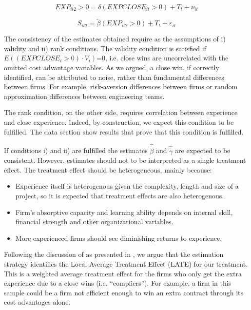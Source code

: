 \begin{equation}
\label{eqn:firststage}
EXP_{it2}>0= \delta (EXPCLOSE_{it}>0)+T_t+\nu_{it}
\end{equation}

\begin{equation}
\label{eqn:secondstage}
S_{it2}= \tilde{\beta} (EXP_{it2}>0)+T_t+\varepsilon_{it}
\end{equation}

The consistency of the estimates obtained require as the assumptions of i) validity and ii) rank conditions. The validity condition is satisfied if $E((EXPCLOSE_{i}>0)\cdot V_i)$=0, i.e. close wins are uncorrelated with the omitted cost advantage variables. As we argued, a close win, if correctly identified, can be attributed to noise, rather than fundamental differences between firms. For example, risk-aversion differences between firms or random approximation differences between engineering teams.

The rank condition, on the other side, requires correlation between experience and close experience. Indeed, by construction, we expect this condition to be fulfilled.  The data section show results that prove that this condition is fulfilled.

If conditions i) and ii) are fulfilled the estimates $\hat{\tilde{\beta}}$ and $\hat{\tilde{\gamma}}$ are expected to be consistent. However, estimates should not to be interpreted as a single treatment effect. The treatment effect should be heterogeneous, mainly because:
\vspace{-5pt}
\begin{itemize}[itemsep=1pt]
  \item Experience itself is heterogenous given the complexity, length and size of a project, so it is expected that treatment effects are also heterogenous.
  \item Firm's absorptive capacity and learning ability depends on internal skill, financial strength and other organizational variables.
  \item More experienced firms should see diminishing returns to experience.
  \end{itemize}

Following the discussion of \parencite{angrist1995identification} as presented in \parencite{hansen2009econometrics}, we argue that the estimation strategy identifies the Local Average Treatment Effect (LATE) for our treatment. This is a weighted average treatment effect for the firms who only get the extra experience due to a close wins (i.e. “compliers”). For example, a firm in this sample could be a firm not efficient enough to win an extra contract through its cost advantages alone.

